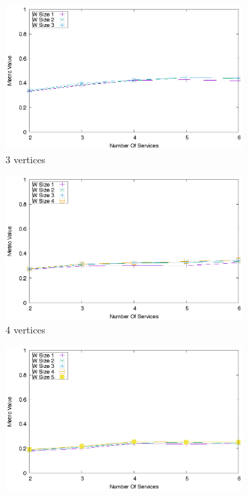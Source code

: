 \begin{figure}[ht]
  \centering
  \begin{subfigure}{0.33\textwidth}
    \includegraphics[width=\textwidth]{Images/graphs/quality_plot_bad_percentage_n3.eps}
    \caption{3 vertices}
    \label{fig:quality_window_bad_a}
  \end{subfigure}
  \hfill
  \begin{subfigure}{0.33\textwidth}
    \includegraphics[width=\textwidth]{Images/graphs/quality_plot_bad_percentage_n4.eps}
    \caption{4 vertices}
    \label{fig:quality_window_bad_b}
  \end{subfigure}
  \hfill
  \begin{subfigure}{0.33\textwidth}
    \includegraphics[width=\textwidth]{Images/graphs/quality_plot_bad_percentage_n5.eps}

\end{subfigure}
\end{figure}
